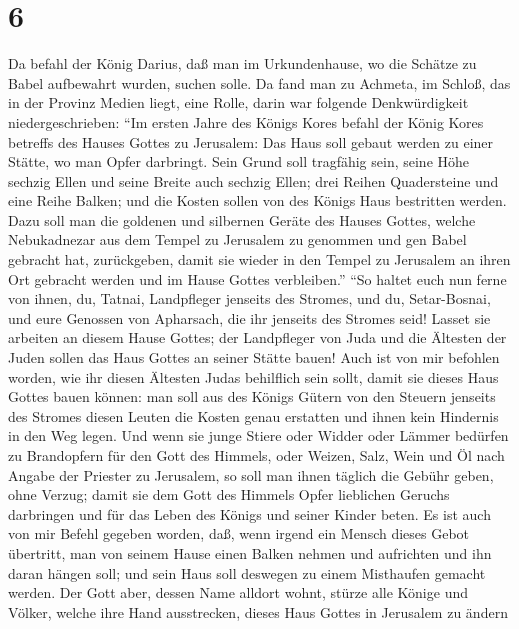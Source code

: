 \hypertarget{section-5}{%
\section{6}\label{section-5}}

 Da befahl der König Darius, daß man im Urkundenhause, wo
die Schätze zu Babel aufbewahrt wurden, suchen solle.  Da
fand man zu Achmeta, im Schloß, das in der Provinz Medien liegt, eine
Rolle, darin war folgende Denkwürdigkeit niedergeschrieben:
 ``Im ersten Jahre des Königs Kores befahl der König Kores
betreffs des Hauses Gottes zu Jerusalem: Das Haus soll gebaut werden zu
einer Stätte, wo man Opfer darbringt. Sein Grund soll tragfähig sein,
seine Höhe sechzig Ellen und seine Breite auch sechzig Ellen;
 drei Reihen Quadersteine und eine Reihe Balken; und die
Kosten sollen von des Königs Haus bestritten werden.  Dazu
soll man die goldenen und silbernen Geräte des Hauses Gottes, welche
Nebukadnezar aus dem Tempel zu Jerusalem zu genommen und gen Babel
gebracht hat, zurückgeben, damit sie wieder in den Tempel zu Jerusalem
an ihren Ort gebracht werden und im Hause Gottes verbleiben.''
 ``So haltet euch nun ferne von ihnen, du, Tatnai,
Landpfleger jenseits des Stromes, und du, Setar-Bosnai, und eure
Genossen von Apharsach, die ihr jenseits des Stromes seid!
 Lasset sie arbeiten an diesem Hause Gottes; der
Landpfleger von Juda und die Ältesten der Juden sollen das Haus Gottes
an seiner Stätte bauen!  Auch ist von mir befohlen worden,
wie ihr diesen Ältesten Judas behilflich sein sollt, damit sie dieses
Haus Gottes bauen können: man soll aus des Königs Gütern von den Steuern
jenseits des Stromes diesen Leuten die Kosten genau erstatten und ihnen
kein Hindernis in den Weg legen.  Und wenn sie junge
Stiere oder Widder oder Lämmer bedürfen zu Brandopfern für den Gott des
Himmels, oder Weizen, Salz, Wein und Öl nach Angabe der Priester zu
Jerusalem, so soll man ihnen täglich die Gebühr geben, ohne Verzug;
 damit sie dem Gott des Himmels Opfer lieblichen Geruchs
darbringen und für das Leben des Königs und seiner Kinder beten.
 Es ist auch von mir Befehl gegeben worden, daß, wenn
irgend ein Mensch dieses Gebot übertritt, man von seinem Hause einen
Balken nehmen und aufrichten und ihn daran hängen soll; und sein Haus
soll deswegen zu einem Misthaufen gemacht werden.  Der
Gott aber, dessen Name alldort wohnt, stürze alle Könige und Völker,
welche ihre Hand ausstrecken, dieses Haus Gottes in Jerusalem zu ändern
